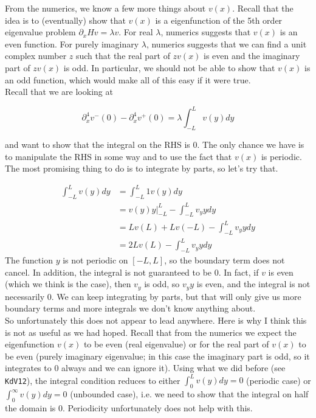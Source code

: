 \documentclass[12pt]{article}
\begin{document}
From the numerics, we know a few more things about $v(x)$. Recall that the idea is to (eventually) show that $v(x)$ is a eigenfunction of the 5th order eigenvalue problem $\partial_x H v = \lambda v$. For real $\lambda$, numerics suggests that $v(x)$ is an even function. For purely imaginary $\lambda$, numerics suggests that we can find a unit complex number $z$ such that the real part of $z v(x)$ is even and the imaginary part of $z v(x)$ is odd. In particular, we should not be able to show that $v(x)$ is an odd function, which would make all of this easy if it were true.\\

Recall that we are looking at 

\[
\partial_x^4 v^-(0) - \partial_x^4 v^+(0) = \lambda \int_{-L}^L v(y) dy
\]

and want to show that the integral on the RHS is 0. The only chance we have is to manipulate the RHS in some way and to use the fact that $v(x)$ is periodic. The most promising thing to do is to integrate by parts, so let's try that.

\begin{align*}
\int_{-L}^L v(y) dy &= \int_{-L}^L 1 v(y) dy\\
&= v(y)y\Big|_{-L}^L - \int_{-L}^L v_y y dy\\
&= L v(L) + Lv(-L) - \int_{-L}^L v_y y dy\\
&= 2Lv(L) - \int_{-L}^L v_y y dy
\end{align*}
The function $y$ is not periodic on $[-L, L]$, so the boundary term does not cancel. In addition, the integral is not guaranteed to be 0. In fact, if $v$ is even (which we think is the case), then $v_y$ is odd, so $v_y y$ is even, and the integral is not necessarily 0. We can keep integrating by parts, but that will only give us more boundary terms and more integrals we don't know anything about. \\

So unfortunately this does not appear to lead anywhere. Here is why I think this is not as useful as we had hoped. Recall that from the numerics we expect the eigenfunction $v(x)$ to be even (real eigenvalue) or for the real part of $v(x)$ to be even (purely imaginary eigenvalue; in this case the imaginary part is odd, so it integrates to 0 always and we can ignore it). Using what we did before (see \texttt{KdV12}), the integral condition reduces to either $\int_0^L v(y) dy = 0$ (periodic case) or $\int_0^\infty v(y) dy = 0$ (unbounded case), i.e. we need to show that the integral on half the domain is 0. Periodicity unfortunately does not help with this.
\end{document}
